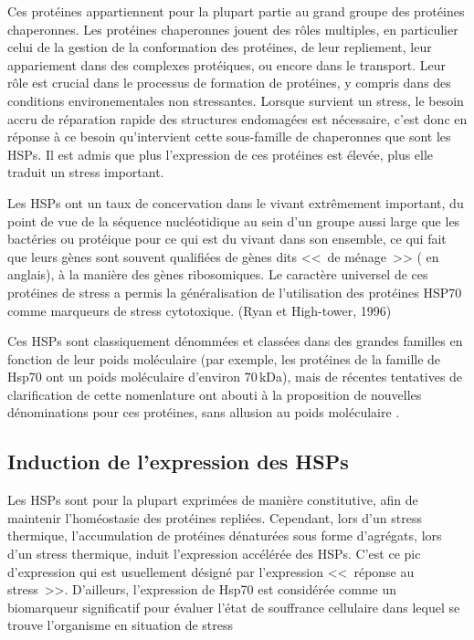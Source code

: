
Ces protéines appartiennent pour la plupart partie au grand groupe des protéines chaperonnes\cite{federhoffmann1999}.
Les protéines chaperonnes jouent des rôles multiples, en particulier celui de la
gestion de la conformation des protéines, de leur repliement, leur appariement
dans des complexes protéiques, ou encore dans le transport. Leur rôle est crucial
dans le processus de formation de protéines, y compris dans des conditions environementales non stressantes.
Lorsque survient un stress, le besoin accru de réparation rapide des
structures endomagées est nécessaire, c'est donc en réponse à ce besoin qu'intervient
cette sous-famille de chaperonnes que sont les HSPs.
Il est admis que plus l'expression de ces protéines est élevée, plus elle traduit un stress important.

Les HSPs ont un taux de concervation dans le vivant extrêmement important, du point de vue de la séquence nucléotidique au sein d'un groupe aussi large que les bactéries ou protéique pour ce qui est du vivant dans son ensemble, ce
qui fait que leurs gènes sont souvent qualifiées de gènes dits <<~de ménage~>>
( en anglais), à la manière des gènes ribosomiques.
Le caractère universel de ces protéines de stress a permis la généralisation de l’utilisation des protéines HSP70 comme marqueurs de stress cytotoxique. (Ryan et High-tower, 1996) %


Ces HSPs sont classiquement dénommées et classées dans des grandes familles en fonction de
leur poids moléculaire \cite{fink1999} (par exemple, les protéines de la
famille de Hsp70 ont un poids moléculaire d'environ 70\,kDa), mais de récentes
tentatives de clarification de cette nomenlature ont abouti à la proposition de nouvelles dénominations pour ces protéines, sans allusion au poids moléculaire \cite{kampinga2009}.


\subsection{Induction de l'expression des HSPs}

Les HSPs sont pour la plupart exprimées de manière constitutive, afin de maintenir l'homéostasie des protéines repliées.
Cependant, lors d’un stress thermique, l'accumulation de protéines dénaturées sous forme d'agrégats, lors d'un stress thermique, induit l'expression accélérée des HSPs.
C'est ce pic d'expression qui est usuellement désigné par l'expression <<~réponse au stress~>>.
D’ailleurs, l'expression de Hsp70 est considérée comme un biomarqueur significatif pour évaluer l'état de souffrance cellulaire dans lequel se trouve l’organisme en situation de stress %

